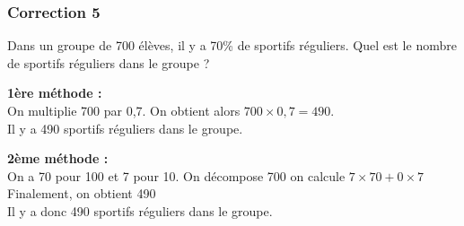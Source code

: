 \documentclass[15pt, mathserif]{beamer}
\begin{document}
\begin{frame}
\vspace{-10mm}
	\frametitle{Correction 5}
Dans un groupe de 700 élèves, il y a 70\% de sportifs réguliers. Quel est le nombre de sportifs réguliers dans le groupe ? \begin{multicols}{2} \textbf{1ère méthode : \\} On multiplie 700 par 0,7. On obtient alors $700 \times 0,7=490$. \\ Il y a 490 sportifs réguliers dans le groupe. 
 \columnbreak 
 
 \textbf{2ème méthode :} \\ On a 70 pour 100 et 7 pour 10. On décompose 700 on calcule $7\times70+0\times7$ \\ Finalement, on obtient 490\\ Il y a donc 490 sportifs réguliers dans le groupe. \end{multicols}\end{frame}
\end{document}
